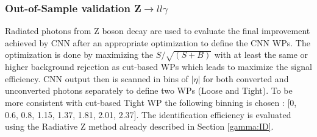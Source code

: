 
\subsubsection{Out-of-Sample validation Z$\rightarrow ll\gamma$}
\label{gamma:CNN:Zllg}
Radiated photons from Z boson decay are used to evaluate the final improvement achieved by CNN after an appropriate optimization to define the CNN WPs. The optimization is done by maximizing the $S/\sqrt{(S+B)}$ with at least the same or higher background rejection as cut-based WPs which leads to maximize the signal efficiency. CNN output then is scanned in bins of $|\eta|$ for both converted and unconverted photons separately to define two WPs (Loose and Tight). To be more consistent with cut-based Tight WP the following binning is chosen : [0, 0.6, 0.8, 1.15, 1.37, 1.81, 2.01, 2.37]. The identification efficiency is evaluated using the Radiative Z method already described in Section \ref{gamma:ID}. 
